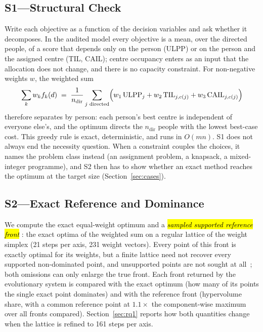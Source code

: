 \documentclass[systems,article,accept,moreauthors,pdftex]{Definitions/mdpi}
\begin{document}
\subsection{S1---Structural Check}
Write each objective as a function of the decision variables and ask whether it
decomposes. In the audited model every objective is a mean, over the directed people, of a
score that depends only on the person (ULPP) or on the person and the assigned centre (TIL,
CAIL); centre occupancy enters as an input that the allocation does not change, and there
is no capacity constraint. For non-negative weights $w$, the weighted sum
\begin{equation}
\sum_k w_k f_k(d) \;=\; \frac{1}{n_{\mathrm{dir}}}\sum_{j \text{ directed}}
\Bigl(w_1\,\mathrm{ULPP}_j + w_2\,\mathrm{TIL}_{j,c(j)} + w_3\,\mathrm{CAIL}_{j,c(j)}\Bigr)
\end{equation}
therefore separates by person: each person's best centre is independent of everyone
else's, and the optimum directs the $n_{\mathrm{dir}}$ people with the lowest best-case
cost. This greedy rule is exact, deterministic, and runs in $O(mn)$. S1 does not always end
the necessity question. When a constraint couples the choices, it names the problem class
instead (an assignment problem, a knapsack, a mixed-integer programme), and S2 then has to
show whether an exact method reaches the optimum at the target size (Section~\ref{sec:cases}).

\subsection{S2---Exact Reference and Dominance}
We compute the exact equal-weight optimum and a \emph{\hl{sampled supported reference front}%
}: the
exact optima of the weighted sum on a regular lattice of the weight simplex (21 steps per
axis, 231 weight vectors). Every point of this front is exactly optimal for its weights, but
a finite lattice need not recover every supported non-dominated point, and unsupported points
are not sought at all~\cite{ehrgott2005multicriteria}; both omissions can only enlarge the true
front. Each front returned by the evolutionary system is compared with the exact optimum (how
many of its points the single exact point dominates) and with the reference front
(hypervolume share, with a common reference point at $1.1\times$ the component-wise maximum
over all fronts compared). Section~\ref{sec:rq1} reports how both quantities change when the
lattice is refined to 161 steps per axis.
\end{document}
